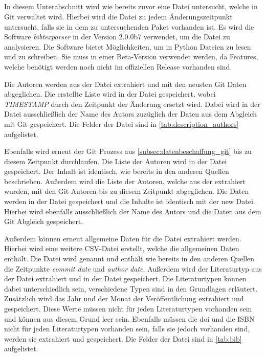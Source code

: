 \subsection{}
\label{subsec:datenbeschaffung_bibtex}
In diesem Unterabschnitt wird wie bereits zuvor eine Datei untersucht, welche in Git verwaltet wird.
Hierbei wird die  Datei zu jedem Änderungszeitpunkt untersucht, falls sie in dem zu untersuchenden Paket vorhanden ist.
Es wird die Software \emph{bibtexparser} in der Version 2.0.0b7 verwendet, um die  Datei zu analysieren.
Die Software bietet Möglichkeiten, um in Python  Dateien zu lesen und zu schreiben.
Sie muss in einer Beta-Version verwendet werden, da Features, welche benötigt werden noch nicht im offiziellen Release vorhanden sind.

Die Autoren werden aus der  Datei extrahiert und mit den neusten Git Daten abgeglichen.
Die erstellte Liste wird in der Datei  gespeichert, wobei \emph{TIMESTAMP} durch den Zeitpunkt der Änderung ersetzt wird.
Dabei wird in der Datei ausschließlich der Name des Autors zuzüglich der Daten aus dem Abgleich mit Git gespeichert.
Die Felder der Datei sind in \autoref{tab:description_authors} aufgelistet.

Ebenfalls wird erneut der Git Prozess aus \autoref{subsec:datenbeschaffung_git} bis zu diesem Zeitpunkt durchlaufen.
Die Liste der Autoren wird in der Datei  gespeichert.
Der Inhalt ist identisch, wie bereits in den anderen Quellen beschrieben.
Außerdem wird die Liste der Autoren, welche aus der  extrahiert wurden, mit den Git Autoren bis zu diesem Zeitpunkt abgeglichen.
Die Daten werden in der Datei  gespeichert und die Inhalte ist identisch mit der \glqq new\grqq{} Datei.
Hierbei wird ebenfalls ausschließlich der Name des Autors und die Daten aus dem Git Abgleich gespeichert.

Außerdem können erneut allgemeine Daten für die  Datei extrahiert werden.
Hierbei wird eine weitere CSV-Datei erstellt, welche die allgemeinen Daten enthält.
Die Datei wird  genannt und enthält wie bereits in den anderen Quellen die Zeitpunkte \emph{commit date} und \emph{author date}.
Außerdem wird der Literaturtyp aus der Datei extrahiert und in der Datei gespeichert.
Die Literaturtypen können dabei unterschiedlich sein, verschiedene Typen sind in den Grundlagen erläutert.
Zusätzlich wird das Jahr und der Monat der Veröffentlichung extrahiert und gespeichert.
Diese Werte müssen nicht für jeden Literaturtypen vorhanden sein und können aus diesem Grund leer sein.
Ebenfalls müssen die \gls{doi} und die ISBN nicht für jeden Literaturtypen vorhanden sein, falls sie jedoch vorhanden sind, werden sie extrahiert und gespeichert.
Die Felder der Datei sind in \autoref{tab:bib} aufgelistet.


